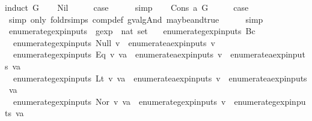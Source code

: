 \begin{isabellebody}
%
\isadelimproof
%
\endisadelimproof
%
\isatagproof
{}\isamarkupfalse%
{\isacharparenleft}induct\ G{\isacharparenright}\isanewline
\ \ \isamarkupfalse%
\ Nil\isanewline
\ \ \isamarkupfalse%
\ \isamarkupfalse%
\ {\isacharquery}case\isanewline
\ \ \ \ \isamarkupfalse%
\ simp\isanewline
{}\isamarkupfalse%
\isanewline
\ \ \isamarkupfalse%
\ {\isacharparenleft}Cons\ a\ G{\isacharparenright}\isanewline
\ \ \isamarkupfalse%
\ \isamarkupfalse%
\ {\isacharquery}case\isanewline
\ \ \ \ \isamarkupfalse%
\ {\isacharparenleft}simp\ only{\isacharcolon}\ foldr{\isachardot}simps\ comp{\isacharunderscore}def\ gval{\isacharunderscore}gAnd\ maybe{\isacharunderscore}and{\isacharunderscore}true{\isacharparenright}\isanewline
\ \ \ \ \isamarkupfalse%
\ simp\isanewline
{}\isamarkupfalse%
%
\endisatagproof
{\isafoldproof}%
%
\isadelimproof
\isanewline
%
\endisadelimproof
\isanewline
{}\isamarkupfalse%
\ enumerate{\isacharunderscore}gexp{\isacharunderscore}inputs\ {\isacharcolon}{\isacharcolon}\ {\isachardoublequoteopen}gexp\ {\isasymRightarrow}\ nat\ set{\isachardoublequoteclose}\ \isanewline
\ \ {\isachardoublequoteopen}enumerate{\isacharunderscore}gexp{\isacharunderscore}inputs\ {\isacharparenleft}Bc\ {\isacharunderscore}{\isacharparenright}\ {\isacharequal}\ {\isacharbraceleft}{\isacharbraceright}{\isachardoublequoteclose}\ {\isacharbar}\isanewline
\ \ {\isachardoublequoteopen}enumerate{\isacharunderscore}gexp{\isacharunderscore}inputs\ {\isacharparenleft}Null\ v{\isacharparenright}\ {\isacharequal}\ enumerate{\isacharunderscore}aexp{\isacharunderscore}inputs\ v{\isachardoublequoteclose}\ {\isacharbar}\isanewline
\ \ {\isachardoublequoteopen}enumerate{\isacharunderscore}gexp{\isacharunderscore}inputs\ {\isacharparenleft}Eq\ v\ va{\isacharparenright}\ {\isacharequal}\ enumerate{\isacharunderscore}aexp{\isacharunderscore}inputs\ v\ {\isasymunion}\ enumerate{\isacharunderscore}aexp{\isacharunderscore}inputs\ va{\isachardoublequoteclose}\ {\isacharbar}\isanewline
\ \ {\isachardoublequoteopen}enumerate{\isacharunderscore}gexp{\isacharunderscore}inputs\ {\isacharparenleft}Lt\ v\ va{\isacharparenright}\ {\isacharequal}\ enumerate{\isacharunderscore}aexp{\isacharunderscore}inputs\ v\ {\isasymunion}\ enumerate{\isacharunderscore}aexp{\isacharunderscore}inputs\ va{\isachardoublequoteclose}\ {\isacharbar}\isanewline
\ \ {\isachardoublequoteopen}enumerate{\isacharunderscore}gexp{\isacharunderscore}inputs\ {\isacharparenleft}Nor\ v\ va{\isacharparenright}\ {\isacharequal}\ enumerate{\isacharunderscore}gexp{\isacharunderscore}inputs\ v\ {\isasymunion}\ enumerate{\isacharunderscore}gexp{\isacharunderscore}inputs\ va{\isachardoublequoteclose}\isanewline

\end{isabellebody}
